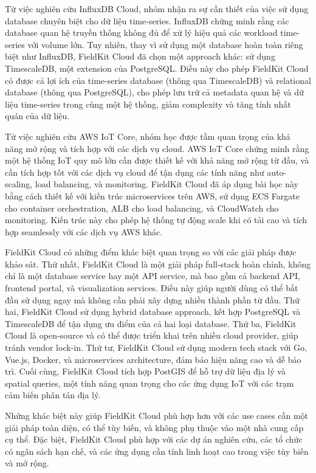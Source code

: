 Từ việc nghiên cứu InfluxDB Cloud, nhóm nhận ra sự cần thiết của việc sử dụng database chuyên biệt cho dữ liệu time-series. InfluxDB chứng minh rằng các database quan hệ truyền thống không đủ để xử lý hiệu quả các workload time-series với volume lớn. Tuy nhiên, thay vì sử dụng một database hoàn toàn riêng biệt như InfluxDB, FieldKit Cloud đã chọn một approach khác: sử dụng TimescaleDB, một extension của PostgreSQL. Điều này cho phép FieldKit Cloud có được cả lợi ích của time-series database (thông qua TimescaleDB) và relational database (thông qua PostgreSQL), cho phép lưu trữ cả metadata quan hệ và dữ liệu time-series trong cùng một hệ thống, giảm complexity và tăng tính nhất quán của dữ liệu.

Từ việc nghiên cứu AWS IoT Core, nhóm học được tầm quan trọng của khả năng mở rộng và tích hợp với các dịch vụ cloud. AWS IoT Core chứng minh rằng một hệ thống IoT quy mô lớn cần được thiết kế với khả năng mở rộng từ đầu, và cần tích hợp tốt với các dịch vụ cloud để tận dụng các tính năng như auto-scaling, load balancing, và monitoring. FieldKit Cloud đã áp dụng bài học này bằng cách thiết kế với kiến trúc microservices trên AWS, sử dụng ECS Fargate cho container orchestration, ALB cho load balancing, và CloudWatch cho monitoring. Kiến trúc này cho phép hệ thống tự động scale khi có tải cao và tích hợp seamlessly với các dịch vụ AWS khác.

FieldKit Cloud có những điểm khác biệt quan trọng so với các giải pháp được khảo sát. Thứ nhất, FieldKit Cloud là một giải pháp full-stack hoàn chỉnh, không chỉ là một database service hay một API service, mà bao gồm cả backend API, frontend portal, và visualization services. Điều này giúp người dùng có thể bắt đầu sử dụng ngay mà không cần phải xây dựng nhiều thành phần từ đầu. Thứ hai, FieldKit Cloud sử dụng hybrid database approach, kết hợp PostgreSQL và TimescaleDB để tận dụng ưu điểm của cả hai loại database. Thứ ba, FieldKit Cloud là open-source và có thể được triển khai trên nhiều cloud provider, giúp tránh vendor lock-in. Thứ tư, FieldKit Cloud sử dụng modern tech stack với Go, Vue.js, Docker, và microservices architecture, đảm bảo hiệu năng cao và dễ bảo trì. Cuối cùng, FieldKit Cloud tích hợp PostGIS để hỗ trợ dữ liệu địa lý và spatial queries, một tính năng quan trọng cho các ứng dụng IoT với các trạm cảm biến phân tán địa lý.

Những khác biệt này giúp FieldKit Cloud phù hợp hơn với các use cases cần một giải pháp toàn diện, có thể tùy biến, và không phụ thuộc vào một nhà cung cấp cụ thể. Đặc biệt, FieldKit Cloud phù hợp với các dự án nghiên cứu, các tổ chức có ngân sách hạn chế, và các ứng dụng cần tính linh hoạt cao trong việc tùy biến và mở rộng.

